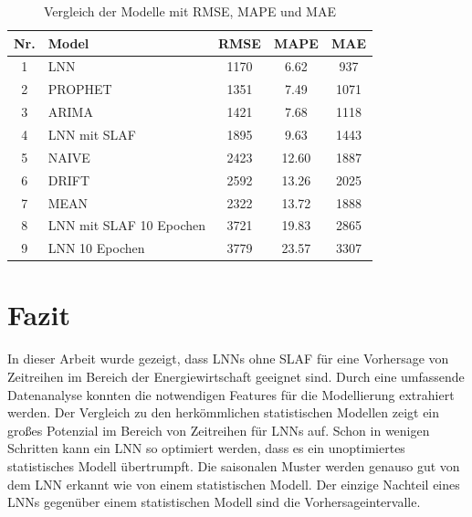 \documentclass[11pt,ngerman,a4paper,]{article}
\begin{document}
\begin{table}[h!]
\centering
\begin{tabular}{|c|l|c|c|c|}
\hline
\textbf{Nr.} & \textbf{Model}              & \textbf{RMSE}    & \textbf{MAPE}    & \textbf{MAE}     \\ \hline
1            & LNN                         & 1170         & 6.62         & 937         \\ \hline
2            & PROPHET                     & 1351         & 7.49         & 1071        \\ \hline
3            & ARIMA                       & 1421         & 7.68         & 1118        \\ \hline
4            & LNN mit SLAF                & 1895         & 9.63        & 1443        \\ \hline
5            & NAIVE                       & 2423         & 12.60        & 1887        \\ \hline
6            & DRIFT                       & 2592         & 13.26        & 2025        \\ \hline
7            & MEAN                        & 2322         & 13.72        & 1888        \\ \hline
8            & LNN mit SLAF 10 Epochen     & 3721         & 19.83        & 2865        \\ \hline
9            & LNN 10 Epochen              & 3779         & 23.57        & 3307        \\ \hline
\end{tabular}
\caption{Vergleich der Modelle mit RMSE, MAPE und MAE}
\label{table:model_comparison}
\end{table}

\clearpage
\newpage

\section{Fazit}\label{fazit}

In dieser Arbeit wurde gezeigt, dass LNNs ohne SLAF für eine Vorhersage von Zeitreihen im Bereich der Energiewirtschaft geeignet sind. Durch eine umfassende Datenanalyse konnten die notwendigen Features für die Modellierung extrahiert werden. Der Vergleich zu den herkömmlichen statistischen Modellen zeigt ein großes Potenzial im Bereich von Zeitreihen für LNNs auf. Schon in wenigen Schritten kann ein LNN so optimiert werden, dass es ein unoptimiertes statistisches Modell übertrumpft. Die saisonalen Muster werden genauso gut von dem LNN erkannt wie von einem statistischen Modell. Der einzige Nachteil eines LNNs gegenüber einem statistischen Modell sind die Vorhersageintervalle.
\end{document}
